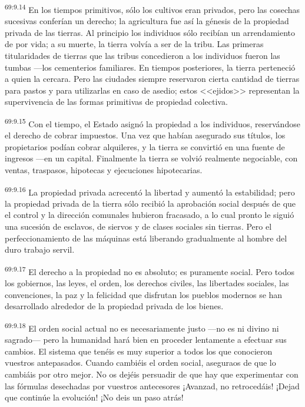 \documentclass[twoside, 11pt]{book}
\begin{document}
\par
\textsuperscript{69:9.14} En los tiempos primitivos, sólo los cultivos eran privados, pero las cosechas sucesivas conferían un derecho; la agricultura fue así la génesis de la propiedad privada de las tierras. Al principio los individuos sólo recibían un arrendamiento de por vida; a su muerte, la tierra volvía a ser de la tribu. Las primeras titularidades de tierras que las tribus concedieron a los individuos fueron las tumbas ---los cementerios familiares. En tiempos posteriores, la tierra perteneció a quien la cercara. Pero las ciudades siempre reservaron cierta cantidad de tierras para pastos y para utilizarlas en caso de asedio; estos <<ejidos>> representan la supervivencia de las formas primitivas de propiedad colectiva.

\par
\textsuperscript{69:9.15} Con el tiempo, el Estado asignó la propiedad a los individuos, reservándose el derecho de cobrar impuestos. Una vez que habían asegurado sus títulos, los propietarios podían cobrar alquileres, y la tierra se convirtió en una fuente de ingresos ---en un capital. Finalmente la tierra se volvió realmente negociable, con ventas, traspasos, hipotecas y ejecuciones hipotecarias.

\par
\textsuperscript{69:9.16} La propiedad privada acrecentó la libertad y aumentó la estabilidad; pero la propiedad privada de la tierra sólo recibió la aprobación social después de que el control y la dirección comunales hubieron fracasado, a lo cual pronto le siguió una sucesión de esclavos, de siervos y de clases sociales sin tierras. Pero el perfeccionamiento de las máquinas está liberando gradualmente al hombre del duro trabajo servil.

\par
\textsuperscript{69:9.17} El derecho a la propiedad no es absoluto; es puramente social. Pero todos los gobiernos, las leyes, el orden, los derechos civiles, las libertades sociales, las convenciones, la paz y la felicidad que disfrutan los pueblos modernos se han desarrollado alrededor de la propiedad privada de los bienes.

\par
\textsuperscript{69:9.18} El orden social actual no es necesariamente justo ---no es ni divino ni sagrado--- pero la humanidad hará bien en proceder lentamente a efectuar sus cambios. El sistema que tenéis es muy superior a todos los que conocieron vuestros antepasados. Cuando cambiéis el orden social, aseguraos de que lo cambiáis por otro mejor. No os dejéis persuadir de que hay que experimentar con las fórmulas desechadas por vuestros antecesores ¡Avanzad, no retrocedáis! ¡Dejad que continúe la evolución! ¡No deis un paso atrás!
\end{document}
